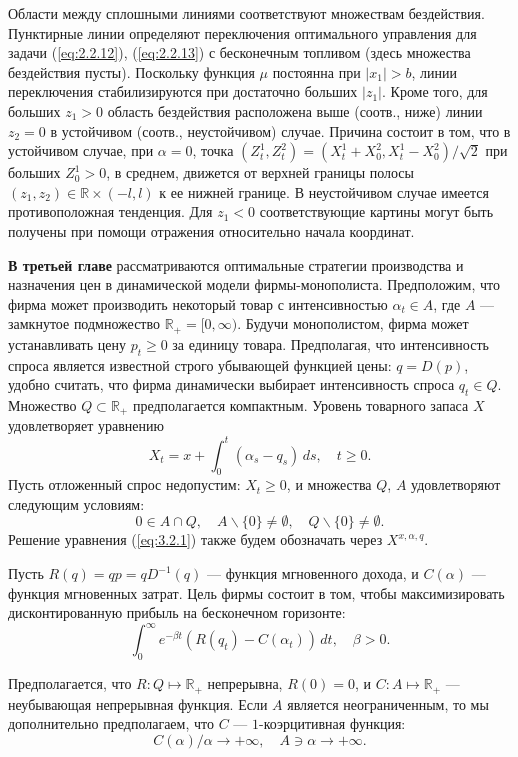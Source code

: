 \documentclass[twoside,12pt]{article}
\begin{document}
Области между сплошными линиями соответствуют множествам бездействия. Пунктирные линии определяют переключения оптимального управления для задачи (\ref{eq:2.2.12}), (\ref{eq:2.2.13}) с бесконечным топливом (здесь множества бездействия пусты).
Поскольку функция $\mu$ постоянна при $|x_1|>b$, линии переключения стабилизируются при достаточно больших  $|z_1|$. Кроме того, для больших $z_1>0$ область бездействия расположена выше (соотв., ниже) линии $z_2=0$ в устойчивом (соотв., неустойчивом) случае. Причина состоит в том, что в устойчивом случае, при $\alpha=0$, точка $(Z^1_t,Z^2_t)=(X_t^1+X_0^2,X_t^1-X_0^2)/\sqrt 2$ при больших $Z^1_0>0$, в среднем, движется от верхней границы полосы $(z_1,z_2)\in\mathbb R\times (-l,l)$ к ее нижней границе. В неустойчивом случае имеется противоположная тенденция. Для $z_1<0$ соответствующие картины могут быть получены при помощи отражения относительно начала координат.

\textbf{В третьей главе} рассматриваются оптимальные стратегии производства и назначения цен в динамической модели фирмы-монополиста.
Предположим, что фирма может производить некоторый товар с интенсивностью $\alpha_t\in A$, где $A$ --- замкнутое подмножество $\mathbb R_+=[0,\infty)$. Будучи монополистом, фирма может устанавливать цену $p_t\ge 0$ за единицу товара.
Предполагая, что интенсивность спроса является известной строго убывающей функцией цены: $q=D(p)$, удобно считать, что фирма динамически выбирает интенсивность спроса  $q_t\in Q$. Множество $Q\subset\mathbb R_+$ предполагается компактным. Уровень товарного запаса $X$ удовлетворяет уравнению
\begin{equation} \label{eq:3.2.1}
 X_t=x+\int_0^t (\alpha_s-q_s)\,ds,\quad t\ge 0.
\end{equation}
Пусть отложенный спрос недопустим: $X_t\ge 0$, и множества $Q$, $A$ удовлетворяют следующим условиям:
\begin{equation} \label{eq:3.2.2}
 0\in A\cap Q,\quad A\backslash\{0\}\neq\emptyset,\quad Q\backslash\{0\}\neq\emptyset.
\end{equation}
Решение уравнения (\ref{eq:3.2.1}) также будем обозначать через $X^{x,\alpha,q}$.

Пусть $R(q)=qp=qD^{-1}(q)$ --- функция мгновенного дохода, и $C(\alpha)$ --- функция мгновенных затрат. Цель фирмы состоит в том, чтобы максимизировать дисконтированную прибыль на бесконечном горизонте:
$$ \int_0^\infty e^{-\beta t} (R(q_t)-C(\alpha_t))\,dt,\quad \beta>0.$$

Предполагается, что $R:Q\mapsto\mathbb R_+$ непрерывна, $R(0)=0$, и $C:A\mapsto\mathbb R_+$ --- неубывающая непрерывная функция. Если $A$ является неограниченным, то мы дополнительно предполагаем, что $C$ --- $1$-коэрцитивная функция:
\begin{equation} \label{eq:3.2.3}
 C(\alpha)/\alpha\to +\infty,\quad A\ni\alpha\to+\infty.
\end{equation}
\end{document}
